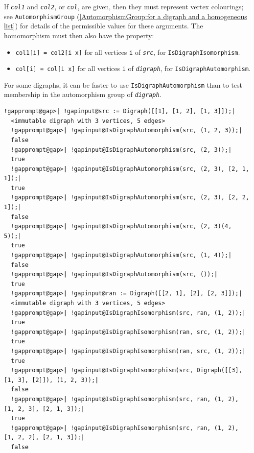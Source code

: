 \documentclass[a4paper,11pt]{report}
\begin{document}
{{{ If \mbox{\texttt{\mdseries\slshape col1}} and \mbox{\texttt{\mdseries\slshape col2}}, or \mbox{\texttt{\mdseries\slshape col}}, are given, then they must represent vertex colourings; see \texttt{AutomorphismGroup} (\ref{AutomorphismGroup:for a digraph and a homogeneous list}) for details of the permissible values for these arguments. The homomorphism
must then also have the property: 
\begin{itemize}
\item  \texttt{col1[i] = col2[i \texttt{} x]} for all vertices \texttt{i} of \mbox{\texttt{\mdseries\slshape src}}, for \texttt{IsDigraphIsomorphism}. 
\item  \texttt{col[i] = col[i \texttt{} x]} for all vertices \texttt{i} of \mbox{\texttt{\mdseries\slshape digraph}}, for \texttt{IsDigraphAutomorphism}. 
\end{itemize}
 For some digraphs, it can be faster to use \texttt{IsDigraphAutomorphism} than to test membership in the automorphism group of \mbox{\texttt{\mdseries\slshape digraph}}. 
\begin{Verbatim}[commandchars=!@|,fontsize=\small,frame=single,label=Example]
  !gapprompt@gap>| !gapinput@src := Digraph([[1], [1, 2], [1, 3]]);|
  <immutable digraph with 3 vertices, 5 edges>
  !gapprompt@gap>| !gapinput@IsDigraphAutomorphism(src, (1, 2, 3));|
  false
  !gapprompt@gap>| !gapinput@IsDigraphAutomorphism(src, (2, 3));|
  true
  !gapprompt@gap>| !gapinput@IsDigraphAutomorphism(src, (2, 3), [2, 1, 1]);|
  true
  !gapprompt@gap>| !gapinput@IsDigraphAutomorphism(src, (2, 3), [2, 2, 1]);|
  false
  !gapprompt@gap>| !gapinput@IsDigraphAutomorphism(src, (2, 3)(4, 5));|
  true
  !gapprompt@gap>| !gapinput@IsDigraphAutomorphism(src, (1, 4));|
  false
  !gapprompt@gap>| !gapinput@IsDigraphAutomorphism(src, ());|
  true
  !gapprompt@gap>| !gapinput@ran := Digraph([[2, 1], [2], [2, 3]]);|
  <immutable digraph with 3 vertices, 5 edges>
  !gapprompt@gap>| !gapinput@IsDigraphIsomorphism(src, ran, (1, 2));|
  true
  !gapprompt@gap>| !gapinput@IsDigraphIsomorphism(ran, src, (1, 2));|
  true
  !gapprompt@gap>| !gapinput@IsDigraphIsomorphism(ran, src, (1, 2));|
  true
  !gapprompt@gap>| !gapinput@IsDigraphIsomorphism(src, Digraph([[3], [1, 3], [2]]), (1, 2, 3));|
  false
  !gapprompt@gap>| !gapinput@IsDigraphIsomorphism(src, ran, (1, 2), [1, 2, 3], [2, 1, 3]);|
  true
  !gapprompt@gap>| !gapinput@IsDigraphIsomorphism(src, ran, (1, 2), [1, 2, 2], [2, 1, 3]);|
  false
\end{Verbatim}
 }

}}
\end{document}
